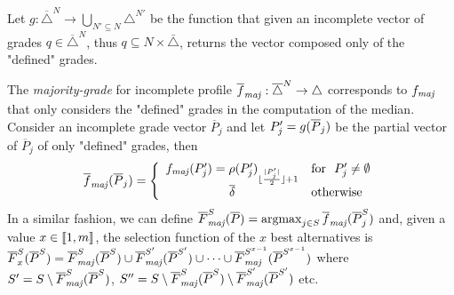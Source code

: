 
Let $g:\overline{\triangle}^N\rightarrow \bigcup_{N' \subseteq N}\triangle^{N'}$ be the function that given an incomplete vector of grades $q \in \overline{\triangle}^N$, thus $q \subseteq N × \bar{\triangle}$, returns the vector composed only of the "defined" grades. 


The \emph{majority-grade} for incomplete profile $\fmajbar: \overline{\triangle}^N \rightarrow \triangle$ corresponds to $\fmaj$ that only considers the "defined" grades in the computation of the median. Consider an incomplete grade vector $\overline{P}_j$ and let $P'_j=g(\overline{P}_j)$ be the partial vector of $\overline{P}_j$ of only "defined" grades, then \[\fmajbar(\Pbar_j)= \left\{ \begin{array}{cl}
	\fmaj(P'_j) =  \rho(P'_j)_{\floor{\frac{\card{P'_j}}{2}} + 1} & \mbox{for } \
	 P'_j \neq \emptyset  \\  \dbar & \mbox{otherwise}
\end{array}\right.
\]
In a similar fashion, we can define $\Fmajbar[S](\Pbar)=\argmax_{j\in S}\fmajbar(\Pbar^S_j)$ and, given a value $x\in \llbracket1,m\rrbracket$, the selection function of the $x$ best alternatives is $\overline{F}^S_x(\Pbar^S) = \Fmajbar[S](\Pbar^S) \cup \Fmajbar[S'](\Pbar^{S'}) \cup \dots \cup \Fmajbar[S^{x-1}](\Pbar^{S^{x-1}})$ where $S'= S \setminus \Fmajbar[S](\Pbar^{S})$, $S''= S \setminus \Fmajbar[S](\Pbar^S) \setminus \Fmajbar[S'](\Pbar^{S'})$ etc.

